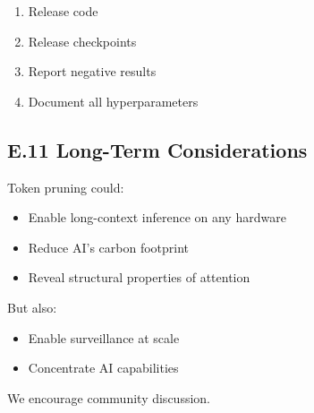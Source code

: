 \begin{enumerate}
\item Release code
\item Release checkpoints
\item Report negative results
\item Document all hyperparameters

\end{enumerate}
\subsection{E.11 Long-Term Considerations}

Token pruning could:

\begin{itemize}
\item Enable long-context inference on any hardware
\item Reduce AI's carbon footprint
\item Reveal structural properties of attention

\end{itemize}
But also:

\begin{itemize}
\item Enable surveillance at scale
\item Concentrate AI capabilities

\end{itemize}
We encourage community discussion.

